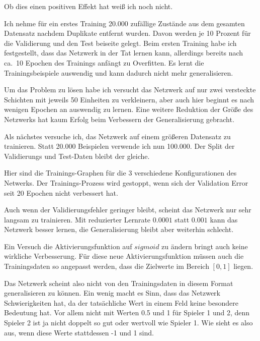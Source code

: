 Ob dies einen positiven Effekt hat weiß ich noch nicht.

\bigskip
Ich nehme für ein erstes Training 20.000 zufällige Zustände aus dem gesamten Datensatz nachdem Duplikate entfernt wurden.
Davon werden je 10 Prozent für die Validierung und den Test beiseite gelegt.
Beim ersten Training habe ich festgestellt, dass das Netzwerk in der Tat lernen kann, allerdings bereits nach ca.\ 10 Epochen des Trainings anfängt zu Overfitten.
Es lernt die Trainingsbeispiele auswendig und kann dadurch nicht mehr generalisieren.


Um das Problem zu lösen habe ich versucht das Netzwerk auf nur zwei versteckte Schichten mit jeweils 50 Einheiten zu verkleinern, aber auch hier beginnt es nach wenigen Epochen an auswendig zu lernen.
Eine weitere Reduktion der Größe des Netzwerks hat kaum Erfolg beim Verbessern der Generalisierung gebracht.


Als nächstes versuche ich, das Netzwerk auf einem größeren Datensatz zu trainieren.
Statt 20.000 Beispielen verwende ich nun 100.000.
Der Split der Validierungs und Test-Daten bleibt der gleiche.

Hier sind die Trainings-Graphen für die 3 verschiedene Konfigurationen des Netwerks.
Der Trainings-Prozess wird gestoppt, wenn sich der Validation Error seit 20 Epochen nicht verbessert hat.


Auch wenn der Validierungsfehler geringer bleibt, scheint das Netzwerk nur sehr langsam zu trainieren.
Mit reduzierter Lernrate $0.0001$ statt $0.001$ kann das Netzwerk besser lernen, die Generalisierung bleibt aber weiterhin schlecht.

Ein Versuch die Aktivierungsfunktion auf $sigmoid$ zu ändern bringt auch keine wirkliche Verbesserung.
Für diese neue Aktivierungsfunktion müssen auch die Trainingsdaten so angepasst werden, dass die Zielwerte im Bereich $[0,1]$ liegen.



Das Netzwerk scheint also nicht von den Trainingsdaten in diesem Format generalisieren zu können.
Ein wenig macht es Sinn, dass das Netzwerk Schwierigkeiten hat, da der tatsächliche Wert in einem Feld keine besondere Bedeutung hat.
Vor allem nicht mit Werten 0.5 und 1 für Spieler 1 und 2, denn Spieler 2 ist ja nicht doppelt so gut oder wertvoll wie Spieler 1.
Wie sieht es also aus, wenn diese Werte stattdessen -1 und 1 sind.



